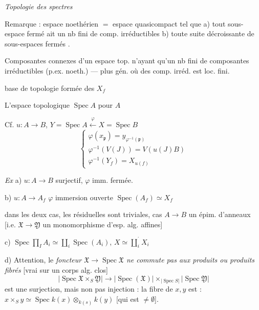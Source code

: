 \documentclass[11pt,a4paper]{article}
\begin{document}
\emph{Topologie des spectres}

Remarque : espace noethérien $=$  espace quasicompact tel que a) tout sous-espace fermé ait un nb fini de comp. irréductibles b) toute suite décroissante de sous-espaces fermés .

Composantes connexes d'un espace top. n'ayant qu'un nb fini de composantes irréductibles (p.ex. noeth.) --- plus gén. où  des comp. irréd. est loc. fini.


base de topologie formée des $X_f$ 

L'espace topologique $\operatorname{Spec} A$ pour $A$  \ill{}

Cf. $u : A \to B$, $Y = \operatorname{Spec} A \xleftarrow{\ \varphi\ } X = \operatorname{Spec} B$
\[
\begin{cases}
\varphi(x_{\mathfrak{p}}) = y_{\varphi^{-1}(\mathfrak{p})} \\
\varphi^{-1}(V(J)) = V(u(J)B) \\
\varphi^{-1}(Y_f) = X_{u(f)}
\end{cases}
\]

\emph{Ex} a) $u : A \to B$ surjectif, $\varphi$ imm. fermée.

b) $u : A \to A_f$ \qquad $\varphi$ immersion ouverte \qquad $\operatorname{Spec}(A_f) \simeq X_f$

dans les deux cas, les  résiduelles sont triviales, cas $A \to B$ un épim. d'anneaux [i.e. $\mathfrak{X} \to \mathfrak{Y}$ un monomorphisme d'esp. alg. affines]

c) $\operatorname{Spec} \prod_{I} A_i \simeq \coprod_i \operatorname{Spec}(A_i)$, \qquad $X \simeq \dot{\coprod_i} X_i$

d) Attention, le \emph{foncteur $\mathfrak{X} \to \operatorname{Spec} \mathfrak{X}$ ne commute pas aux produits ou produits fibrés} [vrai sur un corps alg. clos]
\[
\lvert \operatorname{Spec} \mathfrak{X} \times_S \mathfrak{Y} \rvert \longrightarrow \lvert \operatorname{Spec}(\mathfrak{X}) \rvert \times_{\lvert \operatorname{Spec} S \rvert} \lvert \operatorname{Spec} \mathfrak{Y} \rvert
\]
est une surjection, mais non pas injection : la \struck{\ill{}} fibre de $x, y$ \struck{\ill{}} est  : $x \times_S y \simeq \operatorname{Spec} k(x) \otimes_{k(s)} k(y)$ [qui est $\neq \emptyset$].
\end{document}
